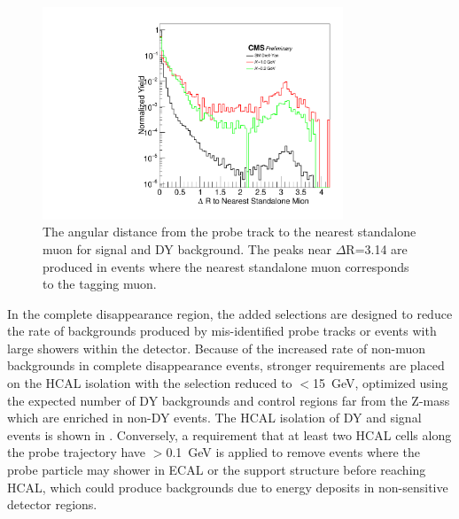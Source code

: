 \begin{figure}[htpb]
	\centering
	\includegraphics[width=0.8\textwidth]{figures/allEventsDrtoNearestStandalone_stack.pdf}
	\caption[Standalone Muon Displacement]{The angular distance from the probe track to the nearest standalone muon for signal and DY background. The peaks near $\Delta$R=3.14 are produced in events where the nearest standalone muon corresponds to the tagging muon.}
	\label{fig:staDR}
\end{figure}

In the complete disappearance region, the added selections are designed to reduce the rate of backgrounds produced by mis-identified probe tracks or events with large showers within the detector.
Because of the increased rate of non-muon backgrounds in complete disappearance events, stronger requirements are placed on the HCAL isolation with the selection reduced to $<$\SI{15}{\giga\eV}, optimized using the expected number of DY backgrounds and control regions far from the Z-mass which are enriched in non-DY events.
The HCAL isolation of DY and signal events is shown in .
Conversely, a requirement that at least two HCAL cells along the probe trajectory have $>$\SI{0.1}{\giga\eV} is applied to remove events where the probe particle may shower in ECAL or the support structure before reaching HCAL, which could produce backgrounds due to energy deposits in non-sensitive detector regions.

